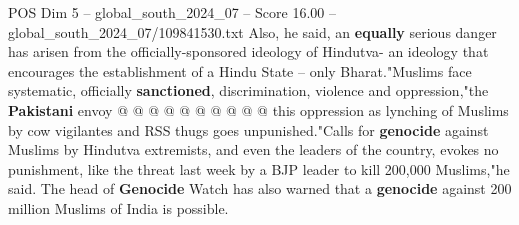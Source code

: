 \begin{textsample}{POS Dim 5 – global\_south\_2024\_07 – Score 16.00 – global\_south\_2024\_07/109841530.txt}
Also, he said, an \textbf{equally} serious danger has arisen from the officially-sponsored ideology of Hindutva- an ideology that encourages the establishment of a Hindu State -- only Bharat."Muslims face systematic, officially \textbf{sanctioned}, discrimination, violence and oppression,"the \textbf{Pakistani} envoy @ @ @ @ @ @ @ @ @ @ this oppression as lynching of Muslims by cow vigilantes and RSS thugs goes unpunished."Calls for \textbf{genocide} against Muslims by Hindutva extremists, and even the leaders of the country, evokes no punishment, like the threat last week by a BJP leader to kill 200,000 Muslims,"he said.
The head of \textbf{Genocide} Watch has also warned that a \textbf{genocide} against 200 million Muslims of India is possible.

\end{textsample}
